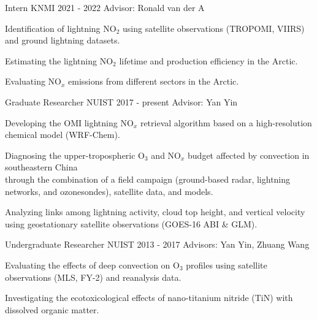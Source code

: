 

\begin{cventries}

  \cventry
    {Intern} %
    {KNMI} %
    {2021 - 2022} %
    {Advisor: Ronald van der A} %
    {
      \begin{cvitems} %
        \item {Identification of lightning NO$_2$ using satellite observations (TROPOMI, VIIRS) and ground lightning datasets.}
        \item {Estimating the lightning NO$_2$ lifetime and production efficiency in the Arctic.}
        \item {Evaluating NO$_x$ emissions from different sectors in the Arctic.}
      \end{cvitems}
    }

  \cventry
    {Graduate Researcher} %
    {NUIST} %
    {2017 - present} %
    {Advisor: Yan Yin} %
    {
      \begin{cvitems} %
        \item {Developing the OMI lightning NO$_x$ retrieval algorithm based on a high-resolution chemical model (WRF-Chem).}
        \item {Diagnosing the upper-tropospheric O$_3$ and NO$_x$ budget affected by convection in southeastern China \\
        through the combination of a field campaign (ground-based radar, lightning networks, and ozonesondes), satellite data, and models.}
        \item {Analyzing links among lightning activity, cloud top height, and vertical velocity using geostationary satellite observations (GOES-16 ABI \& GLM).}
      \end{cvitems}
    }

  \cventry
    {Undergraduate Researcher} %
    {NUIST} %
    {2013 - 2017} %
    {Advisors: Yan Yin, Zhuang Wang} %
    {
      \begin{cvitems} %
        \item {Evaluating the effects of deep convection on O$_3$ profiles using satellite observations (MLS, FY-2) and reanalysis data.}
        \item {Investigating the ecotoxicological effects of nano-titanium nitride (TiN) with dissolved organic matter.}
      \end{cvitems}
    }

\end{cventries}
